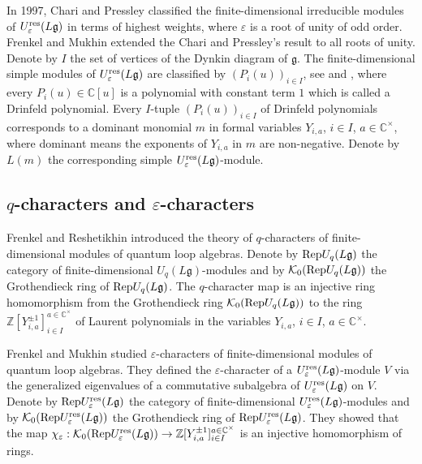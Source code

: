 \documentclass[12pt, reqno]{amsart}
\numberwithin{equation}{section}
\newcommand{\res}{{\rm res}}
\begin{document}
In 1997, Chari and Pressley \cite{CP97b} classified the finite-dimensional irreducible modules of $U_{\varepsilon}^{\res}(L\mathfrak{g})$ in terms of highest weights, where $\varepsilon$ is a root of unity of odd order. Frenkel and Mukhin \cite{FM02} extended the Chari and Pressley's result to all roots of unity. Denote by $I$ the set of vertices of the Dynkin diagram of $\mathfrak{g}$. The finite-dimensional simple modules of $U_{\varepsilon}^{\res}(L\mathfrak{g})$ are classified by $(P_i(u))_{i \in I}$, see \cite[Theorem 8.2]{CP97b} and \cite[Theorem 2.4]{FM02}, where every $P_i(u) \in \mathbb{C}[u]$ is a polynomial with constant term $1$ which is called a Drinfeld polynomial. Every $I$-tuple $(P_i(u))_{i \in I}$ of Drinfeld polynomials corresponds to a dominant monomial $m$ in formal variables $Y_{i,a}$, $i \in I$, $a \in \mathbb{C}^{\times}$, where dominant means the exponents of $Y_{i,a}$ in $m$ are non-negative. Denote by $L(m)$ the corresponding simple $U_{\varepsilon}^{\res}(L\mathfrak{g})$-module.

\subsection{$q$-characters and $\varepsilon$-characters}
Frenkel and Reshetikhin \cite{FR98} introduced the theory of $q$-characters of finite-dimensional modules of quantum loop algebras. Denote by ${\rm Rep} U_{q}(L{\mathfrak{g}})$ the category of finite-dimensional $U_q (L{\mathfrak{g}})$-modules and by $\mathcal{K}_0({\rm Rep} U_{q}(L{\mathfrak{g}}))$ the Grothendieck ring of ${\rm Rep} U_{q}(L{\mathfrak{g}})$. The $q$-character map is an injective ring homomorphism from the Grothendieck ring $\mathcal{K}_0({\rm Rep} U_{q}(L{\mathfrak{g}}))$ to the ring $\mathbb{Z}[Y_{i,a}^{\pm1}]_{i \in I}^{a\in\mathbb{C^{\times}}}$ of Laurent polynomials in the variables $Y_{i,a}$, $i \in I$, $a \in \mathbb{C}^{\times}$.

Frenkel and Mukhin \cite{FM02} studied $\varepsilon$-characters of finite-dimensional modules of quantum loop algebras. They defined the $\varepsilon$-character of a $U_{\varepsilon}^{\res}(L{\mathfrak{g}})$-module $V$ via the generalized eigenvalues of a commutative subalgebra of $U_{\varepsilon}^{\res}(L{\mathfrak{g}})$ on $V$. Denote by ${\rm Rep}U_\varepsilon^{\res}({L\mathfrak{g}})$ the category of finite-dimensional $U_\varepsilon^{\res}({L\mathfrak{g}})$-modules and by $\mathcal{K}_0({\rm Rep}U_\varepsilon^{\res}({L\mathfrak{g}}))$ the Grothendieck ring of ${\rm Rep}U_\varepsilon^{\res}({L\mathfrak{g}})$. They showed that the map $\chi_{\varepsilon}: \mathcal{K}_0({\rm Rep}U_\varepsilon^{\res}({L\mathfrak{g}}))\rightarrow \mathbb{Z}[Y_{i,a}^{\pm1}]_{i\in I}^{a\in\mathbb{C^{\times}}}$ is an injective homomorphism of rings.
\end{document}
